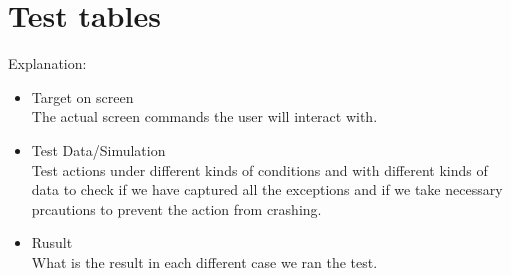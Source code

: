 \section{Test tables}
Explanation: 
\begin{itemize}
	\item Target on screen\\
	The actual screen commands the user will interact with.
	\item Test Data/Simulation\\
	Test actions under different kinds of conditions and with different kinds of data to check if we have captured all the exceptions and if we take necessary prcautions to prevent the action from crashing.
	\item Rusult\\
	What is the result in each different case we ran the test.
\end{itemize}

\newpage

